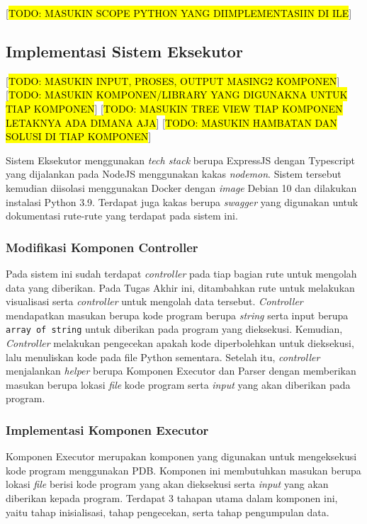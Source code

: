   [\hl{TODO: MASUKIN SCOPE PYTHON YANG DIIMPLEMENTASIIN DI ILE}]

\subsection{Implementasi Sistem Eksekutor}
[\hl{TODO: MASUKIN INPUT, PROSES, OUTPUT MASING2 KOMPONEN}]
[\hl{TODO: MASUKIN KOMPONEN/LIBRARY YANG DIGUNAKNA UNTUK TIAP KOMPONEN}]
[\hl{TODO: MASUKIN TREE VIEW TIAP KOMPONEN LETAKNYA ADA DIMANA AJA}]
[\hl{TODO: MASUKIN HAMBATAN DAN SOLUSI DI TIAP KOMPONEN}]

Sistem Eksekutor menggunakan \textit{tech stack} berupa ExpressJS dengan Typescript yang dijalankan pada NodeJS menggunakan kakas \textit{nodemon}. Sistem tersebut kemudian diisolasi menggunakan Docker dengan \textit{image} Debian 10 dan dilakukan instalasi Python 3.9. Terdapat juga kakas berupa \textit{swagger} yang digunakan untuk dokumentasi rute-rute yang terdapat pada sistem ini.

\subsubsection{Modifikasi Komponen Controller}
Pada sistem ini sudah terdapat \textit{controller} pada tiap bagian rute untuk mengolah data yang diberikan. Pada Tugas Akhir ini, ditambahkan rute untuk melakukan visualisasi serta \textit{controller} untuk mengolah data tersebut. \textit{Controller} mendapatkan masukan berupa kode program berupa \textit{string} serta input berupa \verb|array of string| untuk diberikan pada program yang dieksekusi. Kemudian, \textit{Controller} melakukan pengecekan apakah kode diperbolehkan untuk dieksekusi, lalu menuliskan kode pada file Python sementara. Setelah itu, \textit{controller} menjalankan \textit{helper} berupa Komponen Executor dan Parser dengan memberikan masukan berupa lokasi \textit{file} kode program serta \textit{input} yang akan diberikan pada program.

\subsubsection{Implementasi Komponen Executor}
Komponen Executor merupakan komponen yang digunakan untuk mengeksekusi kode program menggunakan PDB. Komponen ini membutuhkan masukan berupa lokasi \textit{file} berisi kode program yang akan dieksekusi serta \textit{input} yang akan diberikan kepada program. Terdapat 3 tahapan utama dalam komponen ini, yaitu tahap inisialisasi, tahap pengecekan, serta tahap pengumpulan data.

